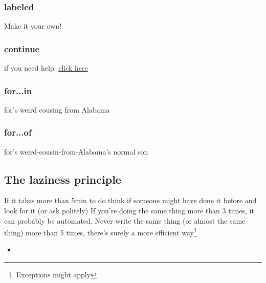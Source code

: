 \subsubsection{labeled}
\label{subsub:labeled}
Make it your own!

\subsubsection{continue}
\label{subsub:continue}
if you need help: \href{http://letmegooglethat.com/?q=continue}{click here}

\subsubsection{for...in}
\label{subsub:forIn}
for's weird cousing from Alabama

\subsubsection{for...of}
\label{subsub:forOf}
for's weird-cousin-from-Alabama's normal son

\subsection{The laziness principle}
\label{sub:lazy}
If it takes more than 5min to do think if someone might have done it before and look for it (or ask politely)
If you're doing the same thing more than 3 times, it can probably be automated. Never write the same thing (or almost the same thing) more than 5 times, there's surely a more efficient way\footnote{Exceptions might apply}

\begin{itemize}
    \item
\end{itemize}
